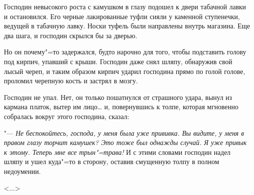 Господин невысокого роста с камушком в глазу подошел к двери табачной лавки и остановился. Его черные лакированные туфли сияли у каменной ступенечки, ведущей в табачную лавку. Носки туфель были направлены внутрь магазина. Еще два шага, и господин скрылся бы за дверью.

Но он почему"=то задержался, будто нарочно для того, чтобы подставить голову под кирпич, упавший с крыши. Господин даже снял шляпу, обнаружив свой лысый череп, и таким образом кирпич ударил господина прямо по голой голове, проломил черепную кость и застрял в мозгу.

Господин не упал. Нет, он только пошатнулся от страшного удара, вынул из кармана платок, вытер им лицо\dots{} и, повернувшись к толпе, которая мгновенно собралась вокруг этого господина, сказал:

"--- \textit{Не беспокойтесь, господа, у меня была уже прививка. Вы видите, у меня в правом глазу торчит камушек? Это тоже был однажды случай. Я уже привык к этому. Теперь мне все трын"=трава!} И с этими словами господин надел шляпу и ушел куда"=то в сторону, оставив смущенную толпу в полном недоумении.

\vspace{1em}
\hfill <...>
